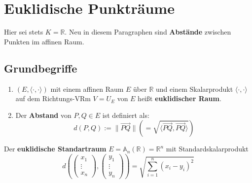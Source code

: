 \documentclass[parskip,a4paper,twoside,DIV15,BCOR12mm]{scrbook}
\begin{document}
\chapter{Euklidische Punkträume}

Hier sei stets $K=\mathbb{R}$. Neu in diesem Paragraphen sind \textbf{Abstände} zwischen 
Punkten im affinen Raum.

\section{Grundbegriffe}

\begin{definition}
\renewcommand{\labelenumi}{(\alph{enumi})}
\begin{enumerate}
\item $(E,\langle\cdot,\cdot\rangle)$ mit einem affinen Raum $E$ über $\mathbb{R}$
und einem Skalarprodukt $\langle\cdot,\cdot\rangle$ auf dem Richtungs-VRm $V=U_E$ 
von $E$ heißt \textbf{euklidischer Raum}.
\item Der \textbf{Abstand} von $P,Q\in E$ ist definiert als:
\[d(P,Q):=\|\overrightarrow{PQ}\| \left(=\sqrt{\langle\overrightarrow{PQ},\overrightarrow{PQ}\rangle}\right)\]
\end{enumerate}
\renewcommand{\labelenumi}{(\arabic{enumi})}
\end{definition}

\begin{example}
Der \textbf{euklidische Standartraum} $E=\mathbb{A}_n(\mathbb{R})=\mathbb{R}^n$ mit Standardskalarprodukt
\[d(\begin{pmatrix}x_1\\\vdots\\x_n\end{pmatrix},\begin{pmatrix}y_1\\\vdots\\y_n\end{pmatrix})
=\sqrt{\sum_{i=1}^n(x_i-y_i)^2}\]
\end{example}

\begin{comment}
Der Abstand $d$ eines euklidischen Raums $E$ definiert eine Metrik auf $E$ (Positivdefinitheit, Symmetrie
und Dreiecksungleichung).
\end{comment}
\end{document}
